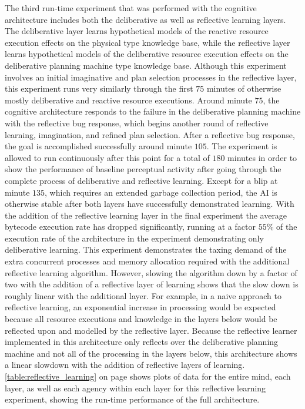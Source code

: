 The third run-time experiment that was performed with the cognitive
architecture includes both the deliberative as well as reflective
learning layers.  The deliberative layer learns hypothetical models of
the reactive resource execution effects on the physical type knowledge
base, while the reflective layer learns hypothetical models of the
deliberative resource execution effects on the deliberative planning
machine type knowledge base.  Although this experiment involves an
initial imaginative and plan selection processes in the reflective
layer, this experiment runs very similarly through the first $75$
minutes of otherwise mostly deliberative and reactive resource
executions.  Around minute $75$, the cognitive architecture responds
to the failure in the deliberative planning machine with the
reflective bug response, which begins another round of reflective
learning, imagination, and refined plan selection.  After a reflective
bug response, the goal is accomplished successfully around minute
$105$.  The experiment is allowed to run continuously after this point
for a total of $180$ minutes in order to show the performance of
baseline perceptual activity after going through the complete process
of deliberative and reflective learning.  Except for a blip at minute
$135$, which requires an extended garbage collection period, the AI is
otherwise stable after both layers have successfully demonstrated
learning.  With the addition of the reflective learning layer in the
final experiment the average bytecode execution rate has dropped
significantly, running at a factor $55$\% of the execution rate of the
architecture in the experiment demonstrating only deliberative
learning.  This experiment demonstrates the taxing demand of the extra
concurrent processes and memory allocation required with the
additional reflective learning algorithm.  However, slowing the
algorithm down by a factor of two with the addition of a reflective
layer of learning shows that the slow down is roughly linear with the
additional layer.  For example, in a naive approach to reflective
learning, an exponential increase in processing would be expected
because all resource executions and knowledge in the layers below
would be reflected upon and modelled by the reflective layer.  Because
the reflective learner implemented in this architecture only reflects
over the deliberative planning machine and not all of the processing
in the layers below, this architecture shows a linear slowdown with
the addition of reflective layers of learning.
\autoref{table:reflective_learning} on page
\pageref{table:reflective_learning} shows plots of data for the entire
mind, each layer, as well as each agency within each layer for this
reflective learning experiment, showing the run-time performance of
the full architecture.

